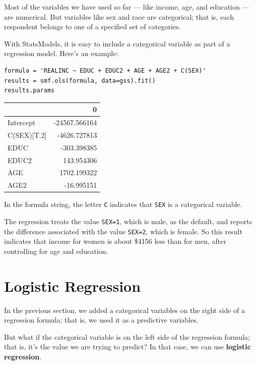 Most of the variables we have used so far --- like income, age, and
education --- are numerical. But variables like sex and race are
categorical; that is, each respondent belongs to one of a specified set
of categories.

With StatsModels, it is easy to include a categorical variable as part
of a regression model. Here's an example:

\begin{lstlisting}[]
formula = 'REALINC ~ EDUC + EDUC2 + AGE + AGE2 + C(SEX)'
results = smf.ols(formula, data=gss).fit()
results.params
\end{lstlisting}

\begin{tabular}{lr}
\midrule
{} &             0 \\
\midrule
Intercept   & -24567.566164 \\
C(SEX)[T.2] &  -4626.727813 \\
EDUC        &   -303.398385 \\
EDUC2       &    143.954306 \\
AGE         &   1702.199322 \\
AGE2        &    -16.995151 \\
\midrule
\end{tabular}

In the formula string, the letter \passthrough{\lstinline!C!} indicates
that \passthrough{\lstinline!SEX!} is a categorical variable.

The regression treats the value \passthrough{\lstinline!SEX=1!}, which
is male, as the default, and reports the difference associated with the
value \passthrough{\lstinline!SEX=2!}, which is female. So this result
indicates that income for women is about \$4156 less than for men, after
controlling for age and education.

\hypertarget{logistic-regression}{%
\section{Logistic Regression}\label{logistic-regression}}

In the previous section, we added a categorical variables on the right
side of a regression formula; that is, we used it as a predictive
variables.

But what if the categorical variable is on the left side of the
regression formula; that is, it's the value we are trying to predict? In
that case, we can use \textbf{logistic regression}.

